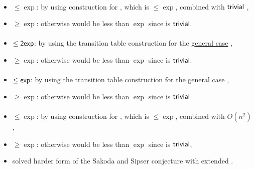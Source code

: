 \paragraph{\ODLA{}\tto\TDFA}\label{cost:1DLAto2DFAu}
\begin{itemize}
	\item $\le\exp$: by using construction for \hyperref[cost:1DLAto1DFAu]{\ODLA{}\tto\ODFA}, which is $\le\exp$, combined with $\mathsf{trivial}$ \ODFA{}\tto\TDFA,
	\item $\ge\exp$: otherwise \hyperref[cost:1DLAto2NFAu]{\ODLA{}\tto\TNFA} would be less than $\exp$ since \TDFA{}\tto\TNFA is $\mathsf{trivial}$.
\end{itemize}
\paragraph{\OLA{}\tto\ODFA}
\begin{itemize}
	\item $\le\mathsf{2exp}$: by using the transition table construction for the \hyperref[cost:1LAto1DFA]{general case} \cite{PigPis14},
	\item $\ge\exp$: otherwise \hyperref[cost:1DLAto1DFAu]{\ODLA{}\tto\ODFA} would be less than $\exp$ since \ODLA{}\tto\OLA is $\mathsf{trivial}$.
\end{itemize}
\paragraph{\OLA{}\tto\ONFA}\label{cost:1DLAto1NFAu}
\begin{itemize}
	\item $\le\mathsf{exp}$: by using the transition table construction for the \hyperref[cost:1LAto1NFA]{general case} \cite{PigPis14},
	\item $\ge\exp$: otherwise \hyperref[cost:1DLAto1NFAu]{\ODLA{}\tto\ONFA} would be less than $\exp$ since \ODLA{}\tto\OLA is $\mathsf{trivial}$.
\end{itemize}
\paragraph{\OLA{}\tto\TDFA}
\begin{itemize}
	\item $\le\exp$: by using construction for \hyperref[cost:1LAto1NFAu]{\OLA{}\tto\ONFA}, which is $\le\exp$, combined with $O(n^2)$ \hyperref[cost:1NFAto2DFAu]{\ONFA{}\tto\TDFA},
	\item $\ge\exp$: otherwise \hyperref[cost:1DLAto2DFAu]{\ODLA{}\tto\TDFA} would be less than $\exp$ since \ODLA{}\tto\OLA is $\mathsf{trivial}$,
	\item solved harder form of the Sakoda and Sipser conjecture with extended \TNFA.
\end{itemize}
